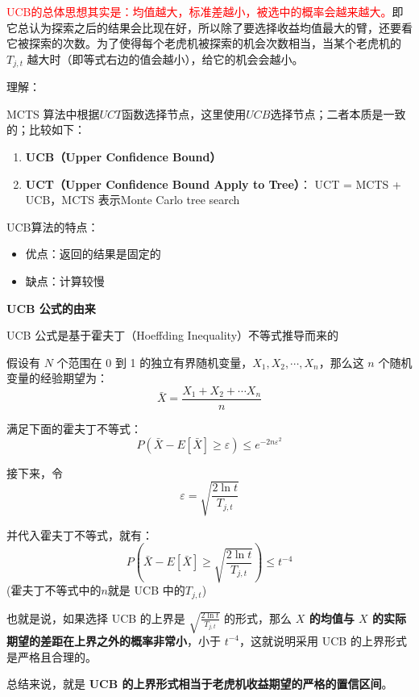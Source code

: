\documentclass[12pt]{article}
\begin{document}
\textcolor{red}{UCB的总体思想其实是：均值越大，标准差越小，被选中的概率会越来越大。}即它总认为探索之后的结果会比现在好，所以除了要选择收益均值最大的臂，还要看它被探索的次数。为了使得每个老虎机被探索的机会次数相当，当某个老虎机的$T_{j,t}$ 越大时（即等式右边的值会越小），给它的机会会越小。

\begin{framed}
理解：

MCTS 算法中根据$UCT$函数选择节点，这里使用$UCB$选择节点；二者本质是一致的；比较如下：
\begin{enumerate}
\setlength{\itemsep}{0pt}
\setlength{\parsep}{0pt}
\setlength{\parskip}{0pt}
    \item \textbf{UCB（Upper Confidence Bound）}
    \item \textbf{UCT（Upper Confidence Bound Apply to Tree）}： UCT = MCTS + UCB，MCTS 表示Monte Carlo tree search
\end{enumerate}

\end{framed}

UCB算法的特点：
\begin{itemize}
\setlength{\itemsep}{0pt}
\setlength{\parsep}{0pt}
\setlength{\parskip}{0pt}
    \item 优点：返回的结果是固定的
    \item 缺点：计算较慢
\end{itemize}

\begin{framed}
\textbf{UCB 公式的由来\cite{Deep_Learning_Recommender_System}}

UCB 公式是基于霍夫丁（Hoeffding Inequality）不等式推导而来的

假设有 $N$ 个范围在 0 到 1 的独立有界随机变量，$X_1, X_2, \cdots, X_n$，那么这 $n$ 个随机变量的经验期望为：
$$
\bar{X} = \frac{X_1 + X_2 + \cdots X_n}{n}
$$

满足下面的霍夫丁不等式：
$$
P(\bar{X} - E[\bar{X}] \ge \varepsilon) \le e^{-2n\varepsilon^2}
$$

接下来，令 
$$
\varepsilon = \sqrt{\frac{2\ln{t}}{T_{j,t}}}
$$

并代入霍夫丁不等式，就有：
$$
P(\bar{X} - E[\bar{X}] \ge \sqrt{\frac{2\ln{t}}{T_{j,t}}}) \le t^{-4}
$$
(霍夫丁不等式中的$n$就是 UCB 中的$T_{j,t}$)

也就是说，如果选择 UCB 的上界是 $\sqrt{\frac{2\ln{t}}{T_{j,t}}}$ 的形式，那么 \textbf{$X$ 的均值与 $X$ 的实际期望的差距在上界之外的概率非常小}，小于 $t^{-4}$，这就说明采用 UCB 的上界形式是严格且合理的。

总结来说，就是 \textbf{UCB 的上界形式相当于老虎机收益期望的严格的置信区间}。
\end{framed}
\end{document}
